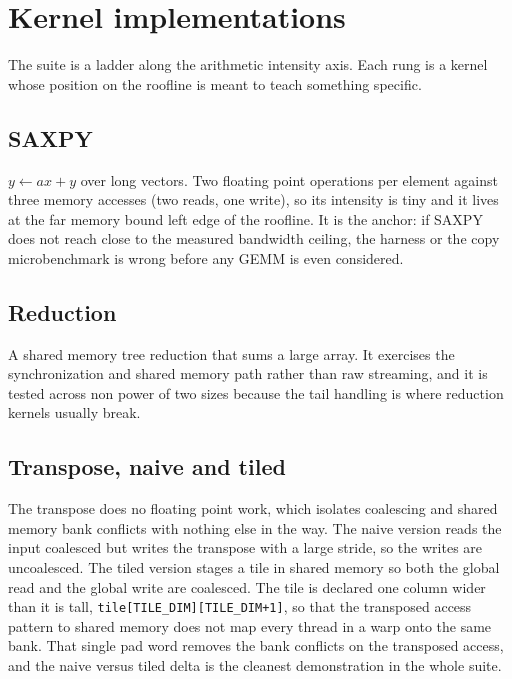 \section{Kernel implementations}

The suite is a ladder along the arithmetic intensity axis. Each rung is a kernel
whose position on the roofline is meant to teach something specific.

\subsection{SAXPY}

$y \leftarrow a x + y$ over long vectors. Two floating point operations per
element against three memory accesses (two reads, one write), so its intensity is
tiny and it lives at the far memory bound left edge of the roofline. It is the
anchor: if SAXPY does not reach close to the measured bandwidth ceiling, the
harness or the copy microbenchmark is wrong before any GEMM is even considered.

\subsection{Reduction}

A shared memory tree reduction that sums a large array. It exercises the
synchronization and shared memory path rather than raw streaming, and it is
tested across non power of two sizes because the tail handling is where reduction
kernels usually break.

\subsection{Transpose, naive and tiled}

The transpose does no floating point work, which isolates coalescing and shared
memory bank conflicts with nothing else in the way. The naive version reads the
input coalesced but writes the transpose with a large stride, so the writes are
uncoalesced. The tiled version stages a tile in shared memory so both the global
read and the global write are coalesced. The tile is declared one column wider
than it is tall, \texttt{tile[TILE\_DIM][TILE\_DIM+1]}, so that the transposed
access pattern to shared memory does not map every thread in a warp onto the same
bank. That single pad word removes the bank conflicts on the transposed access,
and the naive versus tiled delta is the cleanest demonstration in the whole
suite.


